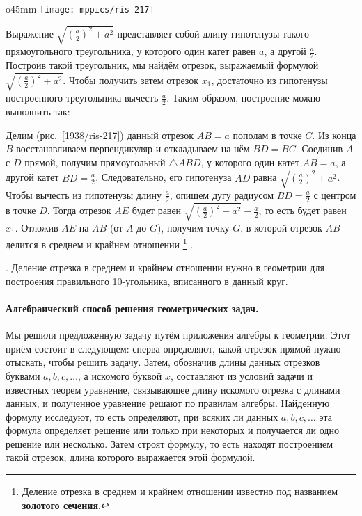 {\begin{wrapfigure}{o}{45mm}
\centering
\texttt{[image: mppics/ris-217]}
\caption{}\label{1938/ris-217}
\end{wrapfigure}

\noindent
Выражение $\sqrt{(\frac a2)^2+a^2}$ представляет собой длину гипотенузы такого прямоугольного треугольника, у которого один катет равен $a$, а другой $\frac a2$.
Построив такой треугольник, мы найдём отрезок, выражаемый формулой $\sqrt{(\frac a2)^2+a^2}$.
Чтобы получить затем отрезок $x_1$, достаточно из гипотенузы построенного треугольника вычесть $\frac a2$.
Таким образом, построение можно выполнить так:

Делим (рис.~\ref{1938/ris-217}) данный отрезок $AB=a$ пополам в точке $C$.
Из конца $B$ восстанавливаем перпендикуляр и откладываем на нём $BD = BC$.
Соединив $A$ с $D$ прямой, получим прямоугольный $\triangle ABD$, у которого один катет $AB=a$, а другой катет $BD=\frac a2$.
Следовательно, его гипотенуза $AD$ равна $\sqrt{(\frac a2)^2+a^2}$.
Чтобы вычесть из гипотенузы длину $\frac a2$, опишем дугу радиусом $BD=\frac a2$ с центром в точке $D$.
Тогда отрезок $AE$ будет равен $\sqrt{(\frac a2)^2+a^2}-\frac a2$, 
то есть будет равен $x_1$.
Отложив $AE$ на $AB$ (от $A$ до $G$), получим точку $G$, в которой отрезок $AB$ делится в среднем и крайнем отношении%
\footnote{Деление отрезка в среднем и крайнем отношении известно под названием \textbf{золотого сечения}.}%
.

{\small
\smallskip
{}.
Деление отрезка в среднем и крайнем отношении нужно в геометрии для построения правильного 10-угольника, вписанного в данный круг.
}

\paragraph{Алгебраический способ решения геометрических задач.}\label{1938/210}
Мы решили предложенную задачу путём приложения алгебры к геометрии.
Этот приём состоит в следующем:
сперва определяют, какой отрезок прямой нужно отыскать, чтобы решить задачу.
Затем, обозначив длины данных отрезков буквами $a, b, c,\dots$, а искомого буквой $x$, составляют из условий задачи и известных теорем уравнение, связывающее длину искомого отрезка с длинами данных, и полученное уравнение решают по правилам алгебры.
Найденную формулу исследуют, то есть определяют, при всяких ли данных $a, b, c,\dots$ эта формула определяет решение или только при некоторых и получается ли одно решение или несколько.
Затем строят формулу, то есть находят построением такой отрезок, длина которого выражается этой формулой.

}
